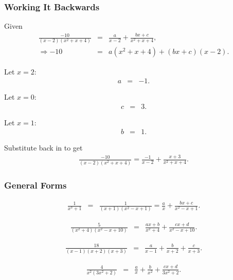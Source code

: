 \begin{frame}
  \frametitle{Working It Backwards}
  
  Given
  \begin{eqnarray*}
    \frac{-10}{(x-2)(x^2+x+4)} & = & \frac{a}{x-2} + \frac{bx+c}{x^2+x+4}, \\
    \Rightarrow -10 & = & a(x^2+x+4) + (bx+c)(x-2).
  \end{eqnarray*}

  {
    Let $x=2$:
    \begin{eqnarray*}
      a & = & -1.
    \end{eqnarray*}

    Let $x=0$:
    \begin{eqnarray*}
      c & = & 3.
    \end{eqnarray*}
 
    Let $x=1$:
    \begin{eqnarray*}
      b & = & 1.
    \end{eqnarray*}

    Substitute back in to get
    \begin{eqnarray*}
     \frac{-10}{(x-2)(x^2+x+4)}= \frac{-1}{x-2} + \frac{x+3}{x^2+x+4}. 
  \end{eqnarray*}

  }

\end{frame}


\begin{frame}
  \frametitle{General Forms}

  \begin{eqnarray*}
    \frac{1}{x^3+1} & = & \frac{1}{(x+1)(x^2-x+1)}= \frac{a}{x} + \frac{bx+c}{x^2-x+1}.
  \end{eqnarray*}

  \begin{eqnarray*}
    \frac{5}{(x^2+4)(x^2-x+10)} & = & \frac{ax+b}{x^2+4} + \frac{cx+d}{x^2-x+10}.
  \end{eqnarray*}

  \begin{eqnarray*}
    \frac{18}{(x-1)(x+2)(x+3)} & = & \frac{a}{x-1} + \frac{b}{x+2} + \frac{c}{x+3}.
  \end{eqnarray*}


  \begin{eqnarray*}
    \frac{4}{x^2(3x^2+2)} & = & \frac{a}{x} + \frac{b}{x^2} + \frac{cx+d}{3x^2+2}.
  \end{eqnarray*}
  
\end{frame}



